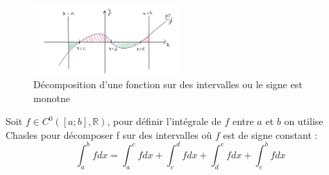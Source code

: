 \begin{figure}[!htb]
    \centering
    \includegraphics[width=0.5\textwidth]{SCHEMA-5.png}
    \caption{Décomposition d'une fonction sur des intervalles ou le signe est monotne}
    \label{fig:SCHEMA-5}
\end{figure}


\begin{definition}
    Soit \(f \in C^{0}([a;b],\mathbb{R})\), pour définir l'intégrale de \(f\) entre \(a\) et \(b\) on utilise Chasles pour décomposer f sur des intervalles où \(f\) est de signe constant : 
    \[
        \int_{a}^{b} f dx = \int_{a}^{c} f dx + \int_{c}^{d} f dx + \int_{d}^{e} f dx + \int_{e}^{b} f dx
    \] 
\end{definition}

